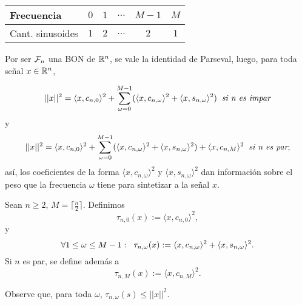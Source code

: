 \vspace{2cm}

\begin{table}[ht]
\centering
  \begin{tabular}{ l | c | c | c | c | c}
    \hline
    Frecuencia & $0$ & $1$ & $\ldots$ & $M-1$ & $M$  \\ \hline
    Cant. sinusoides  & $1$ & $2$ & $\ldots$ & $2$ & $1$ \\
    \hline
  \end{tabular}
\label{Tab: frecuencias TDF n par}
\end{table}

\noindent
Por ser $\mathcal{F}_{n}$ una BON de $\mathbb{R}^{n}$, se vale la
identidad de Parseval, luego, para toda
señal $x \in \mathbb{R}^{n}$,

\begin{equation}
\label{eq0: 25Ap}
||x||^{2} = \langle x , c_{n,0} \rangle^{2}+
\sum\limits_{\omega=0}^{M-1}(\langle x , c_{n,\omega} \rangle^{2} + 
\langle x , s_{n,\omega} \rangle^{2})
\hspace{0.2cm} \textit{si n es impar} 
\end{equation}
y
\begin{equation}
\label{eq1: 25Ap}
||x||^{2} = \langle x , c_{n,0} \rangle^{2}+
\sum\limits_{\omega=0}^{M-1}(\langle x , c_{n,\omega} \rangle^{2} + 
\langle x , s_{n,\omega} \rangle^{2})
+ \langle x , c_{n,M} \rangle^{2}
\hspace{0.2cm} \textit{si n es par};
\end{equation}
así, los coeficientes de la forma
$\langle x , c_{n,\omega} \rangle^{2}$ y 
$\langle x , s_{n,\omega} \rangle^{2}$
dan información sobre el peso que la frecuencia
$\omega$ tiene para sintetizar a la señal $x$.


\begin{defi}
\label{def: taus}
Sean $n \geq 2$, $M = \lceil \frac{n}{2} \rceil $.
Definimos
	\[
	\tau_{n,0}(x) := \langle x, c_{n,0} \rangle^{2},	
	\]
	y
	\[
	\forall 1 \leq \omega \leq M-1: \hspace{0.2cm} 
	\tau_{n,\omega}(x) := \langle x, c_{n,\omega} \rangle^{2}+
	\langle x, s_{n,\omega} \rangle^{2}.	
	\]	
	Si $n$ es par, se define además a
	\[
	\tau_{n,M}(x) := \langle x, c_{n,M} \rangle^{2}.
	\]
\end{defi}
Observe que, para toda $\omega$, 
$\tau_{n, \omega}(s) \leq ||x||^{2}$.

